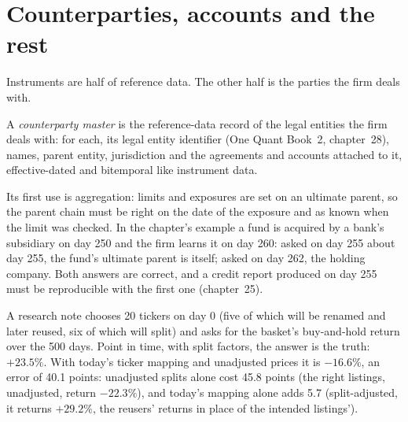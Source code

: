 \section{Counterparties, accounts and the rest}

Instruments are half of reference data. The other half is the parties the firm deals with.

\begin{definition}\label{def:pl:reference-data-and-symbology-services:cpty}
A \emph{counterparty master} is the reference-data record of the legal entities the firm deals with:
for each, its legal entity identifier (One Quant Book~2, chapter~28), names, parent entity, jurisdiction and the agreements and
accounts attached to it, effective-dated and bitemporal like instrument data.
\end{definition}

Its first use is aggregation: limits and exposures are set on an ultimate parent, so the parent chain must be right on the date
of the exposure and as known when the limit was checked. In the chapter's example a fund is acquired by a bank's subsidiary on
day 250 and the firm learns it on day 260: asked on day 255 about day 255, the fund's ultimate parent is itself; asked on day 262,
the holding company. Both answers are correct, and a credit report produced on day 255 must be reproducible with the first one
(chapter~25).

\begin{example}\label{ex:pl:reference-data-and-symbology-services:basket}
A research note chooses 20 tickers on day 0 (five of which will be renamed and later reused, six of which will split) and asks for
the basket's buy-and-hold return over the 500 days. Point in time, with split factors, the answer is the truth: $+23.5\%$. With
today's ticker mapping and unadjusted prices it is $-16.6\%$, an error of 40.1 points: unadjusted splits alone cost 45.8 points
(the right listings, unadjusted, return $-22.3\%$), and today's mapping alone adds 5.7 (split-adjusted, it returns $+29.2\%$, the
reusers' returns in place of the intended listings').
\end{example}

